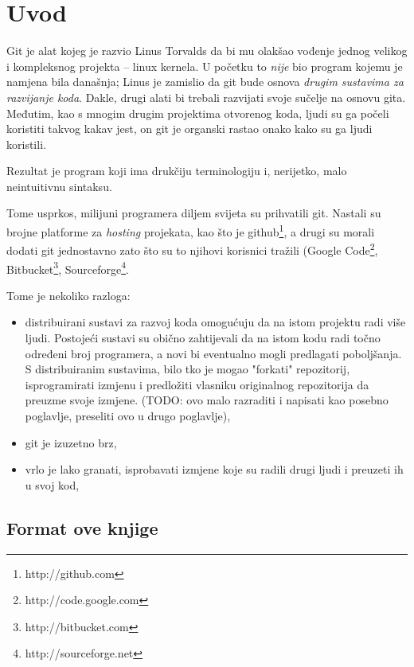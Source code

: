 \chapter*{Uvod}

Git je alat kojeg je razvio Linus Torvalds da bi mu olakšao vođenje jednog velikog i kompleksnog projekta -- linux kernela.
U početku to \emph{nije} bio program kojemu je namjena bila današnja; Linus je zamislio da git bude osnova \emph{drugim sustavima za razvijanje koda}.
Dakle, drugi alati bi trebali razvijati svoje sučelje na osnovu gita.
Međutim, kao s mnogim drugim projektima otvorenog koda, ljudi su ga počeli koristiti takvog kakav jest, on git je organski rastao onako kako su ga ljudi koristili.

Rezultat je program koji ima drukčiju terminologiju i, nerijetko, malo neintuitivnu sintaksu. 

Tome usprkos, milijuni programera diljem svijeta su prihvatili git. 
Nastali su brojne platforme za \emph{hosting} projekata, kao što je github\footnote{http://github.com}, a drugi su morali dodati git jednostavno zato što su to njihovi korisnici tražili (Google Code\footnote{http://code.google.com}, Bitbucket\footnote{http://bitbucket.com}, Sourceforge\footnote{http://sourceforge.net}.

Tome je nekoliko razloga:

\begin{itemize}
	\item distribuirani sustavi za razvoj koda omogućuju da na istom projektu radi više ljudi. Postojeći sustavi su obično zahtijevali da na istom kodu radi točno određeni broj programera, a novi bi eventualno mogli predlagati poboljšanja. S distribuiranim sustavima, bilo tko je mogao "forkati" repozitorij, isprogramirati izmjenu i predložiti vlasniku originalnog repozitorija da preuzme svoje izmjene. (TODO: ovo malo razraditi i napisati kao posebno poglavlje, preseliti ovo u drugo poglavlje),
	\item git je izuzetno brz,
	\item vrlo je lako granati, isprobavati izmjene koje su radili drugi ljudi i preuzeti ih u svoj kod,
\end{itemize}

\section*{Format ove knjige}

